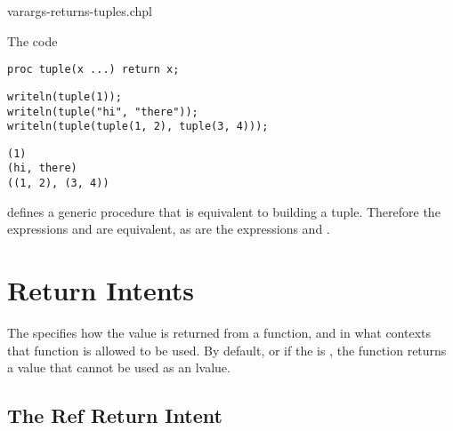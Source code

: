 \begin{chapelexample}{varargs-returns-tuples.chpl}

The code
\begin{chapel}
\begin{verbatim}
proc tuple(x ...) return x;
\end{verbatim}
\end{chapel}
\begin{chapelpost}
\begin{verbatim}
writeln(tuple(1));
writeln(tuple("hi", "there"));
writeln(tuple(tuple(1, 2), tuple(3, 4)));
\end{verbatim}
\end{chapelpost}
\begin{chapeloutput}
\begin{verbatim}
(1)
(hi, there)
((1, 2), (3, 4))
\end{verbatim}
\end{chapeloutput}
defines a generic procedure that is equivalent to building a tuple.
Therefore the expressions  and  are equivalent,
as are the expressions  and .
\end{chapelexample}


\section{Return Intents}
\label{Return_Intent}

The  specifies how the value is returned from a function,
and in what contexts that function is allowed to be used.  By default, or if
the  is , the function returns a value that
cannot be used as an lvalue.


\subsection{The Ref Return Intent}
\label{Ref_Return_Intent}

